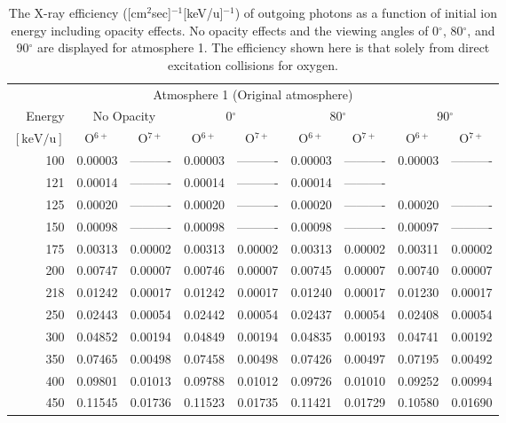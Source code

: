 \begin{table}[ht]
    \centering
    \caption{The X-ray efficiency ([cm$^2$sec]$^{-1}$[keV/u]$^{-1}$) of outgoing photons as a function of initial ion energy including opacity effects. No opacity effects and the viewing angles of 0$^\circ$, 80$^\circ$, and 90$^\circ$ are displayed for atmosphere 1. The efficiency shown here is that solely from direct excitation collisions for oxygen.}
    \begin{tabular}{r|c|c|c|c|c|c|c|c}
    \multicolumn{9}{c}{Atmosphere 1 (Original atmosphere)} \\ \cline{2-9}
    Energy & \multicolumn{2}{c|}{No Opacity} & \multicolumn{2}{c|}{0$^\circ$} & \multicolumn{2}{c|}{80$^\circ$} & \multicolumn{2}{c}{90$^\circ$} \\ \cline{2-9}
    $\mathrm{[keV/u]}$ & O$^{6+}$ & O$^{7+}$ & O$^{6+}$ & O$^{7+}$ & O$^{6+}$ & O$^{7+}$ & O$^{6+}$ & O$^{7+}$ \\ \cline{1-9}
      100 & 0.00003 & ---------- & 0.00003 & ---------- & 0.00003 & ---------- & 0.00003 & ---------- \\
      121 & 0.00014 & ---------- & 0.00014 & ---------- & 0.00014 & ---------- \\
      125 & 0.00020 & ---------- & 0.00020 & ---------- & 0.00020 & ---------- & 0.00020 & ---------- \\
      150 & 0.00098 & ---------- & 0.00098 & ---------- & 0.00098 & ---------- & 0.00097 & ---------- \\
      175 & 0.00313 & 0.00002 & 0.00313 & 0.00002 & 0.00313 & 0.00002 & 0.00311 & 0.00002 \\
      200 & 0.00747 & 0.00007 & 0.00746 & 0.00007 & 0.00745 & 0.00007 & 0.00740 & 0.00007 \\
      218 & 0.01242 & 0.00017 & 0.01242 & 0.00017 & 0.01240 & 0.00017 & 0.01230 & 0.00017 \\
      250 & 0.02443 & 0.00054 & 0.02442 & 0.00054 & 0.02437 & 0.00054 & 0.02408 & 0.00054 \\
      300 & 0.04852 & 0.00194 & 0.04849 & 0.00194 & 0.04835 & 0.00193 & 0.04741 & 0.00192 \\
      350 & 0.07465 & 0.00498 & 0.07458 & 0.00498 & 0.07426 & 0.00497 & 0.07195 & 0.00492 \\
      400 & 0.09801 & 0.01013 & 0.09788 & 0.01012 & 0.09726 & 0.01010 & 0.09252 & 0.00994 \\
      450 & 0.11545 & 0.01736 & 0.11523 & 0.01735 & 0.11421 & 0.01729 & 0.10580 & 0.01690 \\

\end{tabular}
\end{table}
